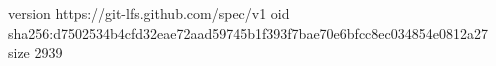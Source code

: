 version https://git-lfs.github.com/spec/v1
oid sha256:d7502534b4cfd32eae72aad59745b1f393f7bae70e6bfcc8ec034854e0812a27
size 2939
